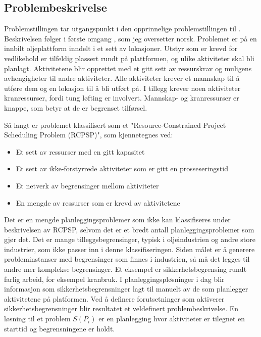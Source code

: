 \subsection{Problembeskrivelse}
Problemstillingen tar utgangspunkt i den opprinnelige problemstillingen til \bht. Beskrivelsen følger i første omgang \cite{tvedtbezem}, som jeg oversetter norsk. Problemet er på en innbilt oljeplattform inndelt i et sett av lokasjoner. Utstyr som er krevd for vedlikehold er tilfeldig plassert rundt på plattformen, og ulike aktiviteter skal bli planlagt. Aktivitetene blir opprettet med et gitt sett av ressurskrav og muligens avhengigheter til andre aktiviteter. Alle aktiviteter krever et mannskap til å utføre dem og en lokasjon til å bli utført på. I tillegg krever noen aktiviteter kranressurser, fordi tung løfting er involvert. Mannskap- og kranressurser er knappe, som betyr at de er begrenset tilførsel.

Så langt er problemet klassifisert som et "Resource-Constrained Project Scheduling Problem (RCPSP)"\cite{RcpspPaperSchutt}, som kjennetegnes ved:
\begin{itemize}
\item Et sett av ressurser med en gitt kapasitet
\item Et sett av ikke-forstyrrede aktiviteter som er gitt en prosseseringstid
\item Et netverk av begrensinger mellom aktiviteter
\item En mengde av ressurser som er krevd av aktivitetene
\end{itemize}

Det er en mengde planleggingsproblemer som ikke kan klassifiseres under beskrivelsen av RCPSP, selvom det er et bredt antall planleggingsproblemer som gjør det. Det er mange tilleggsbegrensinger, typisk i oljeindustrien og andre store industrier, som ikke passer inn i denne klassifiseringen. Siden målet er å generere probleminstanser med begrensinger som finnes i industrien, så må det legges til andre mer komplekse begrensinger. Et eksempel  er sikkerhetsbegrensing rundt farlig arbeid, for eksempel kranbruk. I planleggingspløsninger i dag blir informasjon som sikkerhetsbegrensninger lagt til manuelt av de som planlegger aktivitetene på platformen. Ved å definere forutsetninger som aktiverer sikkerhetsbegrensninger blir resultatet et veldefinert problembeskrivelse. En løsning til et problem $ S(P_{i}) $ er en planlegging hvor aktiviteter er tilegnet en starttid og begrensningene er holdt.

